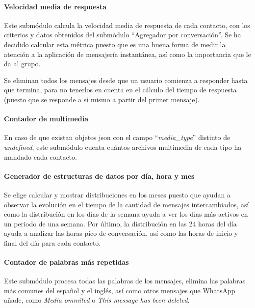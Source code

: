 \paragraph{Velocidad media de respuesta}

Este submódulo calcula la velocidad media de respuesta de cada contacto, con los criterios y datos obtenidos del submódulo ``Agregador por conversación''. Se ha decidido calcular esta métrica puesto que es una buena forma de medir la atención a la aplicación de mensajería instantánea, así como la importancia que le da al grupo.

Se eliminan todos los  mensajes desde que un usuario comienza a responder hasta que termina, para no tenerlos en cuenta en el cálculo del tiempo de respuesta (puesto que se responde a sí mismo a partir del primer mensaje).


\paragraph{Contador de multimedia}

En caso de que existan objetos \acrshort{json} con el campo ``\textit{media\_type}'' distinto de \textit{undefined}, este submódulo cuenta cuántos archivos multimedia de cada tipo ha mandado cada contacto.

\paragraph{Generador de estructuras de datos por día, hora y mes}

Se elige calcular y mostrar distribuciones en los meses puesto que ayudan a observar la evolución en el tiempo de la cantidad de mensajes intercambiados, así como la distribución en los días de la semana ayuda a ver los días más activos en un periodo de una semana. Por último, la distribución en las 24 horas del día ayuda a analizar las horas pico de conversación, así como las horas de inicio y final del día para cada contacto.

\paragraph{Contador de palabras más repetidas}

Este submódulo procesa todas las palabras de los mensajes, elimina las palabras más comunes del español y el inglés, así como otros mensajes que WhatsApp añade, como \textit{Media ommited} o \textit{This message has been deleted}.

